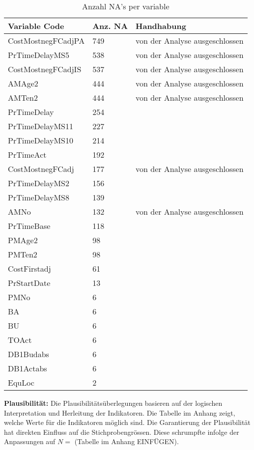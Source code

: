 \begin{table}[h]
	\centering
	\caption{Anzahl NA's per variable}
	\begin{tabular} {| l| l | p{6cm} |}
		\textbf{Variable Code} & \textbf{Anz. NA} & \textbf{Handhabung} \\\hline
		CostMostnegFCadjPA & 749   & von der Analyse ausgeschlossen \\
		PrTimeDelayMS5 & 538   & von der Analyse ausgeschlossen \\
		CostMostnegFCadjIS & 537   & von der Analyse ausgeschlossen \\
		AMAge2 & 444   & von der Analyse ausgeschlossen \\
		AMTen2 & 444   & von der Analyse ausgeschlossen \\
		PrTimeDelay & 254   &  \\
		PrTimeDelayMS11 & 227   &  \\
		PrTimeDelayMS10 & 214   &  \\
		PrTimeAct & 192   &  \\
		CostMostnegFCadj & 177   & von der Analyse ausgeschlossen \\
		PrTimeDelayMS2 & 156   &  \\
		PrTimeDelayMS8 & 139   &  \\
		AMNo  & 132   & von der Analyse ausgeschlossen \\
		PrTimeBase & 118   &  \\
		PMAge2 & 98    &  \\
		PMTen2 & 98    &  \\
		CostFirstadj & 61    &  \\
		PrStartDate & 13    &  \\
		PMNo  & 6     &  \\
		BA    & 6     &  \\
		BU    & 6     &  \\
		TOAct & 6     &  \\
		DB1Budabs & 6     &  \\
		DB1Actabs & 6     &  \\
		EquLoc & 2     &  \\	
	\end{tabular}
\end{table}
\newline
\newline\textbf{Plausibilität:} Die Plausibilitätsüberlegungen basieren auf der logischen Interpretation und Herleitung der Indikatoren. Die Tabelle im Anhang zeigt, welche Werte für die Indikatoren möglich sind. Die Garantierung der Plausibilität hat direkten Einfluss auf die Stichprobengrössen. Diese schrumpfte infolge der Anpassungen auf $N = $  (Tabelle im Anhang EINFÜGEN).
